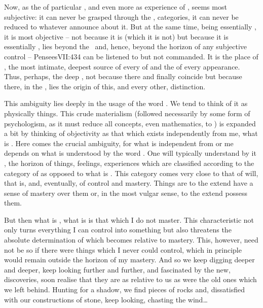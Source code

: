 \pa\label{pa:objsubj}
Now,  as the  of particular , and even more  as  {experience} of , seems most {subjective}:
it can never be grasped through the ,  categories, it
can never be reduced to whatever  announce about it.  But at
the same time, being essentially , it is most {objective} --  not
because it is 
 (which it is not) but because it is essentially ,
lies beyond the \hoa\ and, hence, beyond the horizon of any {subjective} control
-- \citet{man infinitely transcends man.}{Pensees}{VII:434}  can
be listened to but not commanded.  It is the place of , the most
intimate, deepest source of every  of  and the
 of every appearance.  Thus, perhaps, 
the deep , not because there  and
 finally coincide but because there, in the ,
lies the origin of this, and every other, distinction.

\pa This ambiguity lies deeply in the usage of the word .  We
tend to think of it as physically  {things}.  This crude
materialism (followed necessarily by some form of psychologism, as it must
reduce all concepts, even mathematics, to ) is expanded a bit
by thinking of objectivity as that which exists independently from me, what is
.  Here comes the crucial ambiguity, for what is independent from
or  me depends on what is understood by the word .  One will
typically understand by it , the horizon of things, feelings,
experiences which are classified according to the category of  as
opposed to what is .  This category comes very close to that of
will, that is,  and, eventually, of control and mastery.  Things are
 to the extend  have a sense of mastery over them or, in the most
vulgar sense, to the extend  possess them.

But then what is , what is  is that which I do not
master. This characteristic not only turns everything I can control into
something  but also threatens the absolute determination of
 which becomes relative to  mastery. This, however, need not
be so if there were things which I never could control, which in principle would
remain outside the horizon of my mastery. And so we keep digging deeper and
deeper, keep looking further and further, and fascinated by the new,
 discoveries, soon realise that they are as relative to us as
were the old ones which we left behind. Hunting for a shadow, we find pieces of
rocks and, dissatisfied with our constructions of stone, keep looking, chasting
the wind\ldots

